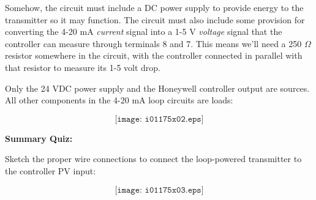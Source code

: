 Somehow, the circuit must include a DC power supply to provide energy to the transmitter so it may function.  The circuit must also include some provision for converting the 4-20 mA {\it current} signal into a 1-5 V {\it voltage} signal that the controller can measure through terminals 8 and 7.  This means we'll need a 250 $\Omega$ resistor somewhere in the circuit, with the controller connected in parallel with that resistor to measure its 1-5 volt drop.
 






Only the 24 VDC power supply and the Honeywell controller output are sources.  All other components in the 4-20 mA loop circuits are loads:

$$\texttt{[image: i01175x02.eps]}$$








\vfil \eject

\noindent
{\bf Summary Quiz:}

Sketch the proper wire connections to connect the loop-powered transmitter to the controller PV input:

$$\texttt{[image: i01175x03.eps]}$$




